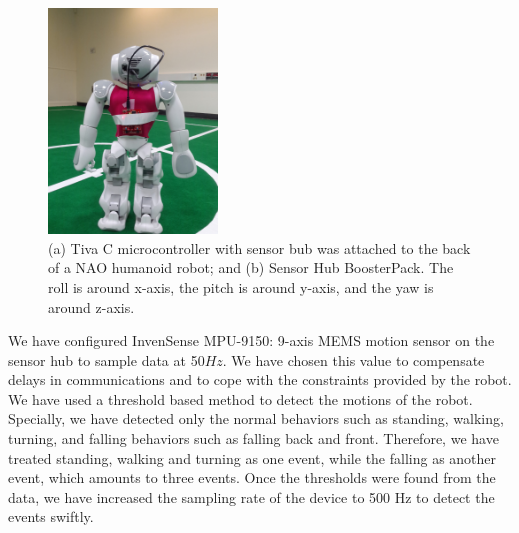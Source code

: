 \documentclass[letterpaper]{article}
\begin{document}
\begin{figure}[!ht]
\centering
 \includegraphics[width=0.4\textwidth] {attached_device}
 \caption{(a) Tiva C microcontroller with sensor bub was attached to the back of a NAO humanoid
robot; and (b) Sensor Hub BoosterPack. The roll is around x-axis, the pitch is around y-axis, and
the yaw is around z-axis.}
 \label{fig:attached_device}
\end{figure}

We have configured InvenSense MPU-9150: 9-axis MEMS motion sensor on the sensor hub to sample data
at 50$Hz$. We have chosen this value to compensate delays in communications and to cope with the
constraints provided by the robot. We have used a threshold based method to detect the motions of
the robot. Specially, we have detected only the normal behaviors such as standing, walking, turning,
and falling behaviors such as falling back and front. Therefore, we have treated standing, walking
and turning as one event, while the falling as another event, which amounts to three events. Once
the thresholds were found from the data, we have increased the sampling rate of the device to 500 Hz
to detect the events swiftly.  
\end{document}
